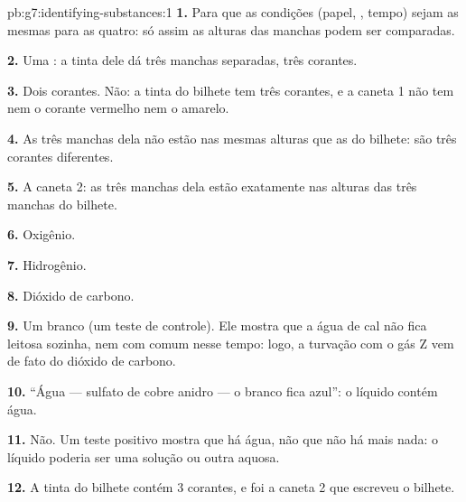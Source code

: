\begin{solution}{pb:g7:identifying-substances:1}
\textbf{1.} Para que as condições (papel, , tempo) sejam as
mesmas para as quatro: só assim as alturas das manchas podem ser
comparadas.

\textbf{2.} Uma : a tinta dele dá três manchas separadas, três
corantes.

\textbf{3.} Dois corantes. Não: a tinta do bilhete tem três corantes, e
a caneta 1 não tem nem o corante vermelho nem o amarelo.

\textbf{4.} As três manchas dela não estão nas mesmas alturas que as do
bilhete: são três corantes diferentes.

\textbf{5.} A caneta 2: as três manchas dela estão exatamente nas
alturas das três manchas do bilhete.

\textbf{6.} Oxigênio.

\textbf{7.} Hidrogênio.

\textbf{8.} Dióxido de carbono.

\textbf{9.} Um branco (um teste de controle). Ele mostra que a água de
cal não fica leitosa sozinha, nem com  comum nesse tempo: logo, a
turvação com o gás Z vem de fato do dióxido de carbono.

\textbf{10.} ``Água --- sulfato de cobre anidro --- o branco fica
azul'': o líquido contém água.

\textbf{11.} Não. Um teste positivo mostra que há água, não que não há
mais nada: o líquido poderia ser uma solução ou outra  aquosa.

\textbf{12.} A tinta do bilhete contém 3 corantes, e foi a caneta 2 que
escreveu o bilhete.
\end{solution}
